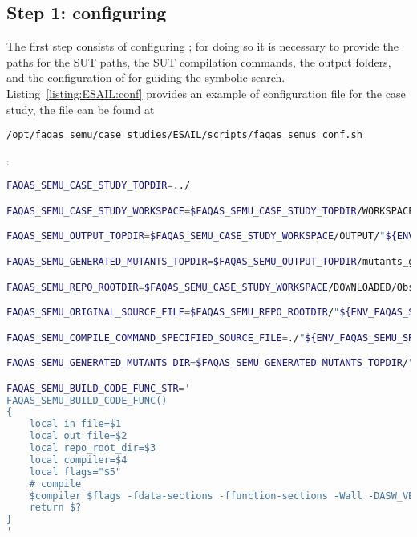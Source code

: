 \subsection{Step 1: configuring \SEMUS}

The first step consists of configuring \SEMUS; for doing so it is necessary to provide the paths for the SUT paths, the SUT compilation commands, the output folders, and the configuration of \SEMU for guiding the symbolic search. Listing~\ref{listing:ESAIL:conf} provides an example of configuration file for the case study, the file can be found at \begin{footnotesize}\texttt{/opt/faqas\_semu/case\_studies/ESAIL/scripts/faqas\_semus\_conf.sh}\end{footnotesize}: 

\begin{lstlisting}[language=bash,label=listing:ESAIL:conf,caption=faqas\_semus\_conf.sh file for ESAIL case study.]
FAQAS_SEMU_CASE_STUDY_TOPDIR=../

FAQAS_SEMU_CASE_STUDY_WORKSPACE=$FAQAS_SEMU_CASE_STUDY_TOPDIR/WORKSPACE

FAQAS_SEMU_OUTPUT_TOPDIR=$FAQAS_SEMU_CASE_STUDY_WORKSPACE/OUTPUT/"${ENV_FAQAS_SEMU_SRC_FILE%.c}"

FAQAS_SEMU_GENERATED_MUTANTS_TOPDIR=$FAQAS_SEMU_OUTPUT_TOPDIR/mutants_generation

FAQAS_SEMU_REPO_ROOTDIR=$FAQAS_SEMU_CASE_STUDY_WORKSPACE/DOWNLOADED/Obsw

FAQAS_SEMU_ORIGINAL_SOURCE_FILE=$FAQAS_SEMU_REPO_ROOTDIR/"${ENV_FAQAS_SEMU_SRC_FILE}"

FAQAS_SEMU_COMPILE_COMMAND_SPECIFIED_SOURCE_FILE=./"${ENV_FAQAS_SEMU_SRC_FILE}"

FAQAS_SEMU_GENERATED_MUTANTS_DIR=$FAQAS_SEMU_GENERATED_MUTANTS_TOPDIR/"${ENV_FAQAS_SEMU_SRC_FILE%.c}"

FAQAS_SEMU_BUILD_CODE_FUNC_STR='
FAQAS_SEMU_BUILD_CODE_FUNC()
{
    local in_file=$1
    local out_file=$2
    local repo_root_dir=$3
    local compiler=$4
    local flags="$5"
    # compile
    $compiler $flags -fdata-sections -ffunction-sections -Wall -DASW_VERSION_MAJOR=4 -DASW_VERSION_MINOR=1 -DSVN_REVISION=0 -DDEBUG -DUNIT_TEST -O0 -g -DTARGET -I$repo_root_dir/Source/_Ext/check_for_target/include/ -DLOG_WCET -DSCHEDULER_TRACKING -I$repo_root_dir/Source/./. -I$repo_root_dir/Source/ApplicationLayer/. -I$repo_root_dir/Source/ServiceLayer/. -I$repo_root_dir/Source/HighLevelDriverLayer/. -I$repo_root_dir/Source/HighLevelDriverLayer/CAN_Handler/Private/. -I$repo_root_dir/Source/ProtocolLayer/. -I$repo_root_dir/Source/LowLevelDriverLayer/. -I$repo_root_dir/Source/Utilities/. -I/opt/rtems-4.8-SAT-AIS/sparc-rtems4.8/leon3/lib/include -I$repo_root_dir/Source/_Ext/mlfs/include -o $out_file $in_file $flags
    return $?
}
'


\end{lstlisting}
